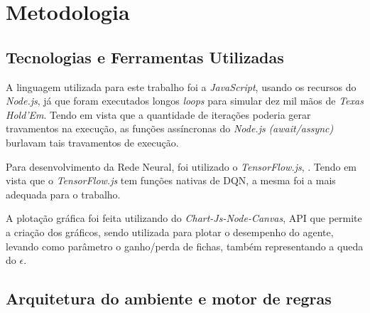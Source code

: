 
\chapter{Metodologia}
\label{chap:metodologia}

\section{Tecnologias e Ferramentas Utilizadas}

A linguagem utilizada para este trabalho foi a \textit{JavaScript}, usando os recursos do \textit{Node.js}, já que foram executados longos \textit{loops} para simular dez mil mãos de \textit{Texas Hold'Em}. Tendo em vista que a quantidade de iterações poderia gerar travamentos na execução, as funções assíncronas do \textit{Node.js} \textit{(await/assync)} burlavam tais travamentos de execução.

Para desenvolvimento da Rede Neural, foi utilizado o \textit{TensorFlow.js}, . Tendo em vista que o \textit{TensorFlow.js} tem funções nativas de \gls{DQN}, a mesma foi a mais adequada para o trabalho.

A plotação gráfica foi feita utilizando do \textit{Chart-Js-Node-Canvas}, \gls{API} que permite a criação dos gráficos, sendo utilizada para plotar o desempenho do agente, levando como parâmetro o ganho/perda de fichas, também representando a queda do $\epsilon$.

\section{Arquitetura do ambiente e motor de regras}

